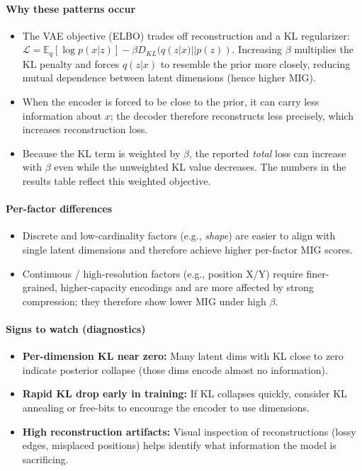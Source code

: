\documentclass[conference]{IEEEtran}
\begin{document}
\paragraph{Why these patterns occur}
\begin{itemize}
    \item The VAE objective (ELBO) trades off reconstruction and a KL regularizer: $\mathcal{L} = \mathbb{E}_{q}[\log p(x|z)] - \beta D_{KL}(q(z|x)||p(z))$. Increasing $\beta$ multiplies the KL penalty and forces $q(z|x)$ to resemble the prior more closely, reducing mutual dependence between latent dimensions (hence higher MIG).
    \item When the encoder is forced to be close to the prior, it can carry less information about $x$; the decoder therefore reconstructs less precisely, which increases reconstruction loss.
    \item Because the KL term is weighted by $\beta$, the reported \emph{total} loss can increase with $\beta$ even while the unweighted KL value decreases. The numbers in the results table reflect this weighted objective.
\end{itemize}

\paragraph{Per-factor differences}
\begin{itemize}
    \item Discrete and low-cardinality factors (e.g., \emph{shape}) are easier to align with single latent dimensions and therefore achieve higher per-factor MIG scores.
    \item Continuous / high-resolution factors (e.g., position X/Y) require finer-grained, higher-capacity encodings and are more affected by strong compression; they therefore show lower MIG under high $\beta$.
\end{itemize}

\paragraph{Signs to watch (diagnostics)}
\begin{itemize}
    \item \textbf{Per-dimension KL near zero:} Many latent dims with KL close to zero indicate posterior collapse (those dims encode almost no information).
    \item \textbf{Rapid KL drop early in training:} If KL collapses quickly, consider KL annealing or free-bits to encourage the encoder to use dimensions.
    \item \textbf{High reconstruction artifacts:} Visual inspection of reconstructions (lossy edges, misplaced positions) helps identify what information the model is sacrificing.
\end{itemize}
\end{document}
